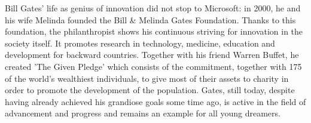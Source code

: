 Bill Gates’ life as genius of innovation did not stop to Microsoft: in 2000, he and his wife Melinda founded the Bill \& Melinda Gates Foundation. Thanks to this foundation, the philanthropist shows his continuous striving for innovation in the society itself. It promotes research in technology, medicine, education and development for backward countries. Together with his friend Warren Buffet, he created 'The Given Pledge' which consists of the commitment, together with 175 of the world's wealthiest individuals, to give most of their assets to charity in order to promote the development of the population\textsuperscript{\cite{TheGivenPledge}}. Gates, still today, despite having already achieved his grandiose goals some time ago, is active in the field of advancement and progress and remains an example for all young dreamers.